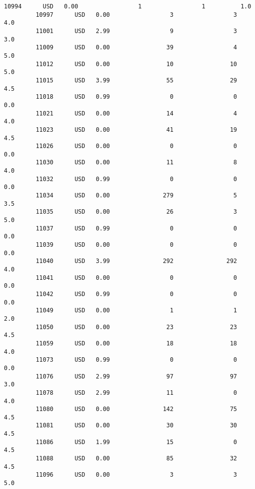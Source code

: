 \documentclass[11pt]{article}
\begin{document}
\begin{Verbatim}[commandchars=\\\{\}]
         10994      USD   0.00                 1                 1          1.0   
         10997      USD   0.00                 3                 3          4.0   
         11001      USD   2.99                 9                 3          3.0   
         11009      USD   0.00                39                 4          5.0   
         11012      USD   0.00                10                10          5.0   
         11015      USD   3.99                55                29          4.5   
         11018      USD   0.99                 0                 0          0.0   
         11021      USD   0.00                14                 4          4.0   
         11023      USD   0.00                41                19          4.5   
         11026      USD   0.00                 0                 0          0.0   
         11030      USD   0.00                11                 8          4.0   
         11032      USD   0.99                 0                 0          0.0   
         11034      USD   0.00               279                 5          3.5   
         11035      USD   0.00                26                 3          5.0   
         11037      USD   0.99                 0                 0          0.0   
         11039      USD   0.00                 0                 0          0.0   
         11040      USD   3.99               292               292          4.0   
         11041      USD   0.00                 0                 0          0.0   
         11042      USD   0.99                 0                 0          0.0   
         11049      USD   0.00                 1                 1          2.0   
         11050      USD   0.00                23                23          4.5   
         11059      USD   0.00                18                18          4.0   
         11073      USD   0.99                 0                 0          0.0   
         11076      USD   2.99                97                97          3.0   
         11078      USD   2.99                11                 0          4.0   
         11080      USD   0.00               142                75          4.5   
         11081      USD   0.00                30                30          4.5   
         11086      USD   1.99                15                 0          4.5   
         11088      USD   0.00                85                32          4.5   
         11096      USD   0.00                 3                 3          5.0   
         

\end{Verbatim}
\end{document}
